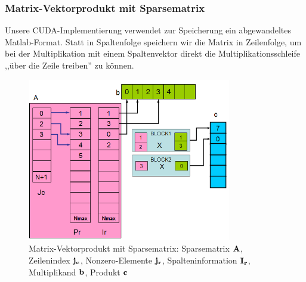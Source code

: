 
\subsubsection{Matrix-Vektorprodukt mit Sparsematrix}





Unsere CUDA-Implementierung verwendet zur Speicherung ein abgewandeltes
Matlab-Format. Statt in Spaltenfolge speichern wir die Matrix
in Zeilenfolge, um bei der Multiplikation mit einem Spaltenvektor direkt
die Multiplikationsschleife ,,über die Zeile treiben'' zu können.

\begin{figure}[htbp]
\includegraphics[width=3.5in]{../xby/pic//sparseMul}
\caption{Matrix-Vektorprodukt mit Sparsematrix: Sparsematrix $\bf A $, Zeilenindex $ \bf j_c$, Nonzero-Elemente $\bf j_r$,  Spalteninformation $ \bf I_r$, Multiplikand $\bf b$, Produkt $\bf c$}
\label{sparseMul}
\end{figure}